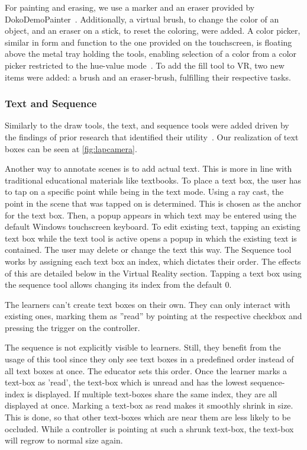 For painting and erasing, we use a marker and an eraser provided by DokoDemoPainter~\cite{dokoDemo}. Additionally, a virtual brush, to change the color of an object, and an eraser on a stick, to reset the coloring, were added. A color picker, similar in form and function to the one provided on the touchscreen, is floating above the metal tray holding the tools, enabling selection of a color from a color picker restricted to the hue-value mode~\cite{hueValue}. To add the fill tool to VR, two new items were added: a brush and an eraser-brush, fulfilling their respective tasks.

\subsubsection{Text and Sequence}
Similarly to the draw tools, the text, and sequence tools were added driven by the findings of prior research that identified their utility~\cite{vuforiaAnnotations}. Our realization of text boxes can be seen at \autoref{fig:lapcamera}.

 Another way to annotate scenes is to add actual text. This is more in line with traditional educational materials like textbooks. To place a text box, the user has to tap on a specific point while being in the text mode. Using a ray cast, the point in the scene that was tapped on is determined. This is chosen as the anchor for the text box. Then, a popup appears in which text may be entered using the default Windows touchscreen keyboard. To edit existing text, tapping an existing text box while the text tool is active opens a popup in which the existing text is contained. The user may delete or change the text this way. The Sequence tool works by assigning each text box an index, which dictates their order. The effects of this are detailed below in the Virtual Reality section. Tapping a text box using the sequence tool allows changing its index from the default 0.

 The learners can't create text boxes on their own. They can only interact with existing ones, marking them as ''read'' by pointing at the respective checkbox and pressing the trigger on the controller. 

The sequence is not explicitly visible to learners. Still, they benefit from the usage of this tool since they only see text boxes in a predefined order instead of all text boxes at once. The educator sets this order. Once the learner marks a text-box as 'read', the text-box which is unread and has the lowest sequence-index is displayed. If multiple text-boxes share the same index, they are all displayed at once.
%
Marking a text-box as read makes it smoothly shrink in size. This is done, so that other text-boxes which are near them are less likely to be occluded. While a controller is pointing at such a shrunk text-box, the text-box will regrow to normal size again.
%
